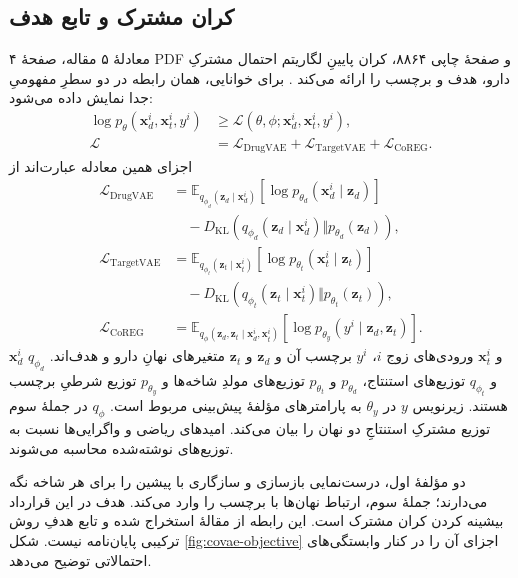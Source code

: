 \subsection{کران مشترک و تابع هدف}
معادلهٔ ۵ مقاله، صفحهٔ ۴ PDF و صفحهٔ چاپی ۸۸۶۴، کران پایینِ لگاریتم احتمال مشترکِ دارو، هدف و برچسب را ارائه می‌کند \cite{Li22CoVAE}. برای خوانایی، همان رابطه در دو سطرِ مفهومیِ جدا نمایش داده می‌شود:
\begin{equation}
\begin{aligned}
\log p_\theta(\mathbf{x}_d^i,\mathbf{x}_t^i,y^i)
&\geq \mathcal{L}(\theta,\phi;\mathbf{x}_d^i,\mathbf{x}_t^i,y^i),\\
\mathcal{L}
&=\mathcal{L}_{\mathrm{DrugVAE}}
+\mathcal{L}_{\mathrm{TargetVAE}}
+\mathcal{L}_{\mathrm{CoREG}}.
\end{aligned}
\label{eq:covae-elbo}
\end{equation}
اجزای همین معادله عبارت‌اند از
\begin{equation}
\begin{aligned}
\mathcal{L}_{\mathrm{DrugVAE}}
&=\mathbb{E}_{q_{\phi_d}(\mathbf{z}_d\mid\mathbf{x}_d^i)}
[\log p_{\theta_d}(\mathbf{x}_d^i\mid\mathbf{z}_d)]\\
&\quad-D_{\mathrm{KL}}\!\left(
q_{\phi_d}(\mathbf{z}_d\mid\mathbf{x}_d^i)
\Vert p_{\theta_d}(\mathbf{z}_d)\right),\\
\mathcal{L}_{\mathrm{TargetVAE}}
&=\mathbb{E}_{q_{\phi_t}(\mathbf{z}_t\mid\mathbf{x}_t^i)}
[\log p_{\theta_t}(\mathbf{x}_t^i\mid\mathbf{z}_t)]\\
&\quad-D_{\mathrm{KL}}\!\left(
q_{\phi_t}(\mathbf{z}_t\mid\mathbf{x}_t^i)
\Vert p_{\theta_t}(\mathbf{z}_t)\right),\\
\mathcal{L}_{\mathrm{CoREG}}
&=\mathbb{E}_{q_\phi(\mathbf{z}_d,\mathbf{z}_t\mid
\mathbf{x}_d^i,\mathbf{x}_t^i)}
[\log p_{\theta_y}(y^i\mid\mathbf{z}_d,\mathbf{z}_t)].
\end{aligned}
\label{eq:covae-components}
\end{equation}
$\mathbf{x}_d^i$ و $\mathbf{x}_t^i$ ورودی‌های زوج $i$، $y^i$ برچسب آن و $\mathbf{z}_d$ و $\mathbf{z}_t$ متغیرهای نهانِ دارو و هدف‌اند. $q_{\phi_d}$ و $q_{\phi_t}$ توزیع‌های استنتاج، $p_{\theta_d}$ و $p_{\theta_t}$ توزیع‌های مولدِ شاخه‌ها و $p_{\theta_y}$ توزیع شرطیِ برچسب هستند. زیرنویس $y$ در $\theta_y$ به پارامترهای مؤلفهٔ پیش‌بینی مربوط است. $q_\phi$ در جملهٔ سوم توزیع مشترکِ استنتاجِ دو نهان را بیان می‌کند. امیدهای ریاضی و واگرایی‌ها نسبت به توزیع‌های نوشته‌شده محاسبه می‌شوند.

دو مؤلفهٔ اول، درست‌نمایی بازسازی و سازگاری با پیشین را برای هر شاخه نگه می‌دارند؛ جملهٔ سوم، ارتباط نهان‌ها با برچسب را وارد می‌کند. هدف در این قرارداد بیشینه کردن کران مشترک است. این رابطه از مقالهٔ  استخراج شده و تابع هدفِ روش ترکیبی پایان‌نامه نیست. شکل \ref{fig:covae-objective} اجزای آن را در کنار وابستگی‌های احتمالاتی توضیح می‌دهد.

